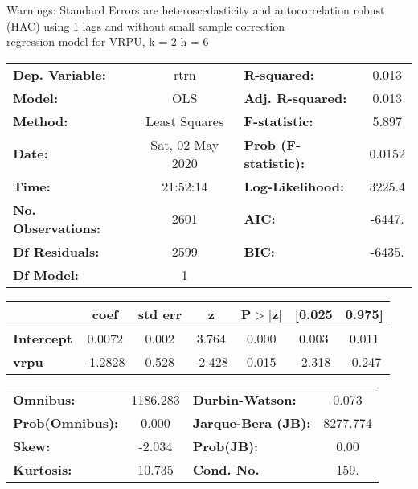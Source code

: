 Warnings: \newline
 [1] Standard Errors are heteroscedasticity and autocorrelation robust (HAC) using 1 lags and without small sample correction\\ 

regression model for VRPU, k = 2 h = 6\begin{center}
\begin{tabular}{lclc}
\toprule
\textbf{Dep. Variable:}    &       rtrn       & \textbf{  R-squared:         } &     0.013   \\
\textbf{Model:}            &       OLS        & \textbf{  Adj. R-squared:    } &     0.013   \\
\textbf{Method:}           &  Least Squares   & \textbf{  F-statistic:       } &     5.897   \\
\textbf{Date:}             & Sat, 02 May 2020 & \textbf{  Prob (F-statistic):} &   0.0152    \\
\textbf{Time:}             &     21:52:14     & \textbf{  Log-Likelihood:    } &    3225.4   \\
\textbf{No. Observations:} &        2601      & \textbf{  AIC:               } &    -6447.   \\
\textbf{Df Residuals:}     &        2599      & \textbf{  BIC:               } &    -6435.   \\
\textbf{Df Model:}         &           1      & \textbf{                     } &             \\
\bottomrule
\end{tabular}
\begin{tabular}{lcccccc}
                   & \textbf{coef} & \textbf{std err} & \textbf{z} & \textbf{P$> |$z$|$} & \textbf{[0.025} & \textbf{0.975]}  \\
\midrule
\textbf{Intercept} &       0.0072  &        0.002     &     3.764  &         0.000        &        0.003    &        0.011     \\
\textbf{vrpu}      &      -1.2828  &        0.528     &    -2.428  &         0.015        &       -2.318    &       -0.247     \\
\bottomrule
\end{tabular}
\begin{tabular}{lclc}
\textbf{Omnibus:}       & 1186.283 & \textbf{  Durbin-Watson:     } &    0.073  \\
\textbf{Prob(Omnibus):} &   0.000  & \textbf{  Jarque-Bera (JB):  } & 8277.774  \\
\textbf{Skew:}          &  -2.034  & \textbf{  Prob(JB):          } &     0.00  \\
\textbf{Kurtosis:}      &  10.735  & \textbf{  Cond. No.          } &     159.  \\
\bottomrule
\end{tabular}
\end{center}

